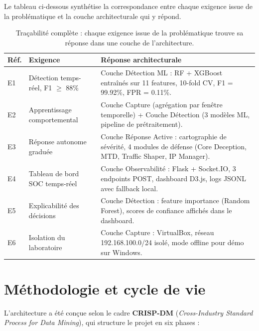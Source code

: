\documentclass[12pt,a4paper]{article}
\begin{document}
Le tableau ci-dessous synth\'{e}tise la correspondance entre chaque exigence
issue de la probl\'{e}matique et la couche architecturale qui y r\'{e}pond.

\begin{table}[h!]
\centering
\small
\begin{tabularx}{\textwidth}{l L{4cm} X}
\toprule
\textbf{R\'{e}f.} & \textbf{Exigence} & \textbf{R\'{e}ponse architecturale} \\
\midrule
E1 & D\'{e}tection temps-r\'{e}el,
     F1 $\geq$ 88\% &
     Couche D\'{e}tection ML : RF + XGBoost entra\^{i}n\'{e}s sur 11 features,
     10-fold CV, F1 = 99.92\%, FPR = 0.11\%. \\
E2 & Apprentissage comportemental &
     Couche Capture (agr\'{e}gation par fen\^{e}tre temporelle) +
     Couche D\'{e}tection (3 mod\`{e}les ML, pipeline de pr\'{e}traitement). \\
E3 & R\'{e}ponse autonome gradu\'{e}e &
     Couche R\'{e}ponse Active : cartographie de s\'{e}v\'{e}rit\'{e},
     4 modules de d\'{e}fense (Core Deception, MTD, Traffic Shaper, IP Manager). \\
E4 & Tableau de bord SOC temps-r\'{e}el &
     Couche Observabilit\'{e} : Flask + Socket.IO, 3 endpoints POST,
     dashboard D3.js, logs JSONL avec fallback local. \\
E5 & Explicabilit\'{e} des d\'{e}cisions &
     Couche D\'{e}tection : feature importance (Random Forest), scores de
     confiance affich\'{e}s dans le dashboard. \\
E6 & Isolation du laboratoire &
     Couche Capture : VirtualBox, r\'{e}seau 192.168.100.0/24 isol\'{e},
     mode offline pour d\'{e}mo sur Windows. \\
\bottomrule
\end{tabularx}
\caption{Tra\c{c}abilit\'{e} compl\`{e}te : chaque exigence issue de la
probl\'{e}matique trouve sa r\'{e}ponse dans une couche de l'architecture.}
\label{tab:tracabilite}
\end{table}

\section{M\'{e}thodologie et cycle de vie}

L'architecture a \'{e}t\'{e} con\c{c}ue selon le cadre \textbf{CRISP-DM}
(\textit{Cross-Industry Standard Process for Data Mining}), qui structure le
projet en six phases :
\end{document}
